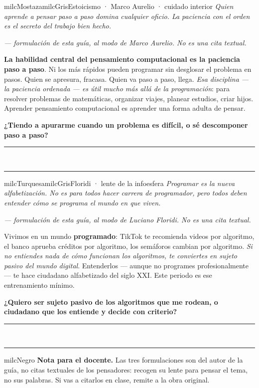\documentclass[11pt,letterpaper]{article}
\newcommand{\linead}[1]{\noindent\color{milcLinea}\rule{#1}{0.5pt}\color{milcNegro}}
\begin{document}
\begin{softbox}{milcMostaza}{milcGris}{Estoicismo · Marco Aurelio · cuidado interior}
\textit{Quien aprende a pensar paso a paso domina cualquier oficio. La paciencia con el orden es el secreto del trabajo bien hecho.}

{\footnotesize\itshape\color{milcNegro!70}--- formulación de esta guía, al modo de Marco Aurelio. No es una cita textual.}

\textbf{La habilidad central del pensamiento computacional es la paciencia paso a paso}. Ni los más rápidos pueden programar sin desglosar el problema en pasos. Quien se apresura, fracasa. Quien va paso a paso, llega. \emph{Esa disciplina --- la paciencia ordenada --- es útil mucho más allá de la programación}: para resolver problemas de matemáticas, organizar viajes, planear estudios, criar hijos. Aprender pensamiento computacional es aprender una forma adulta de pensar.

\textbf{¿Tiendo a apurarme cuando un problema es difícil, o sé descomponer paso a paso?}
\end{softbox}
\linead{\linewidth}\\[1mm]
\linead{\linewidth}

\begin{softbox}{milcTurquesa}{milcGris}{Floridi · lente de la infoesfera}
\textit{Programar es la nueva alfabetización. No es para todos hacer carrera de programador, pero todos deben entender cómo se programa el mundo en que viven.}

{\footnotesize\itshape\color{milcNegro!70}--- formulación de esta guía, al modo de Luciano Floridi. No es una cita textual.}

Vivimos en un mundo \textbf{programado}: TikTok te recomienda videos por algoritmo, el banco aprueba créditos por algoritmo, los semáforos cambian por algoritmo. \emph{Si no entiendes nada de cómo funcionan los algoritmos, te conviertes en sujeto pasivo del mundo digital}. Entenderlos --- aunque no programes profesionalmente --- te hace ciudadano alfabetizado del siglo XXI. Este periodo es ese entrenamiento mínimo.

\textbf{¿Quiero ser sujeto pasivo de los algoritmos que me rodean, o ciudadano que los entiende y decide con criterio?}
\end{softbox}
\linead{\linewidth}\\[1mm]
\linead{\linewidth}

\begin{infoband}{milcNegro}
\textbf{Nota para el docente.} Las tres formulaciones son del autor de la guía, no citas textuales de los pensadores: recogen su lente para pensar el tema, no sus palabras. Si vas a citarlos en clase, remite a la obra original.
\end{infoband}
\end{document}
